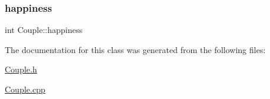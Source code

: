 \mbox{\label{class_couple_aee78d616688f0cccff84e1c23cb31f7a}} 
\subsubsection{\texorpdfstring{happiness}{happiness}}
{\footnotesize\ttfamily int Couple\+::happiness}



The documentation for this class was generated from the following files\+:\begin{DoxyCompactItemize}
\item 
\hyperlink{_couple_8h}{Couple.\+h}\item 
\hyperlink{_couple_8cpp}{Couple.\+cpp}\end{DoxyCompactItemize}
